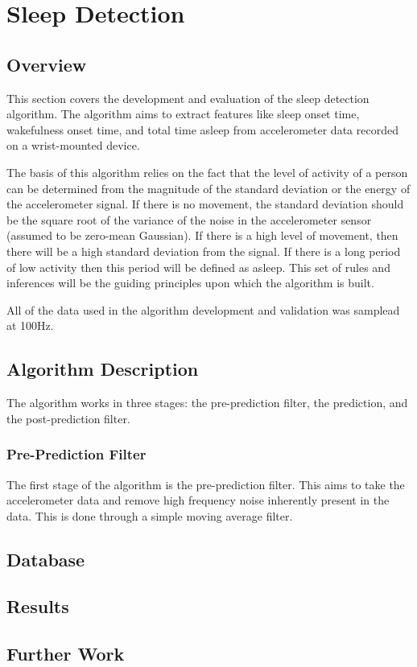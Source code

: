 \part{Sleep Detection}

    \chapter{Overview}

        This section covers the development and evaluation of the sleep detection algorithm. The algorithm aims to extract features like sleep onset time, wakefulness onset time, and total time asleep from accelerometer data recorded on a wrist-mounted device.

        The basis of this algorithm relies on the fact that the level of activity of a person can be determined from the magnitude of the standard deviation or the energy of the accelerometer signal. If there is no movement, the standard deviation should be the square root of the variance of the noise in the accelerometer sensor (assumed to be zero-mean Gaussian). If there is a high level of movement, then there will be a high standard deviation from the signal. If there is a long period of low activity then this period will be defined as asleep. This set of rules and inferences will be the guiding principles upon which the algorithm is built.

        All of the data used in the algorithm development and validation was samplead at 100Hz.

    \chapter{Algorithm Description}

        The algorithm works in three stages: the pre-prediction filter, the prediction, and the post-prediction filter.

        \section{Pre-Prediction Filter}

            The first stage of the algorithm is the pre-prediction filter. This aims to take the accelerometer data and remove high frequency noise inherently present in the data. This is done through a simple moving average filter.


    \chapter{Database}

    \chapter{Results}

    \chapter{Further Work}